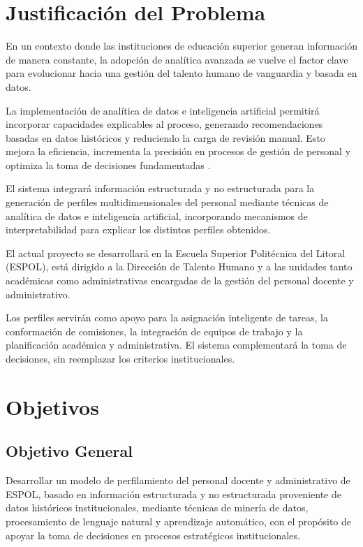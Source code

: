     \section{Justificación del Problema}

        En un contexto donde las instituciones de educación superior generan información de manera constante, la adopción de analítica avanzada se vuelve el factor clave para evolucionar hacia una gestión del talento humano de vanguardia y basada en datos.

        La implementación de analítica de datos e inteligencia artificial permitirá incorporar capacidades explicables al proceso, generando recomendaciones basadas en datos históricos y reduciendo la carga de revisión manual. Esto mejora la eficiencia, incrementa la precisión en procesos de gestión de personal y optimiza la toma de decisiones fundamentadas \parencite{Nawaz2024,Alam2026}.

        El sistema integrará información estructurada y no estructurada para la generación de perfiles multidimensionales del personal mediante técnicas de analítica de datos e inteligencia artificial, incorporando mecanismos de interpretabilidad para explicar los distintos perfiles obtenidos.

        El actual proyecto se desarrollará en la Escuela Superior Politécnica del Litoral (ESPOL), está dirigido a la Dirección de Talento Humano y a las unidades tanto académicas como administrativas encargadas de la gestión del personal docente y administrativo.

        Los perfiles servirán como apoyo para la asignación inteligente de tareas, la conformación de comisiones, la integración de equipos de trabajo y la planificación académica y administrativa. El sistema complementará la toma de decisiones, sin reemplazar los criterios institucionales.

        
    \section{Objetivos}
        \subsection{Objetivo General}
            Desarrollar un modelo de perfilamiento del personal docente y administrativo de ESPOL, basado en información estructurada y no estructurada proveniente de datos históricos institucionales, mediante técnicas de minería de datos, procesamiento de lenguaje natural y aprendizaje automático, con el propósito de apoyar la toma de decisiones en procesos estratégicos institucionales.
        
